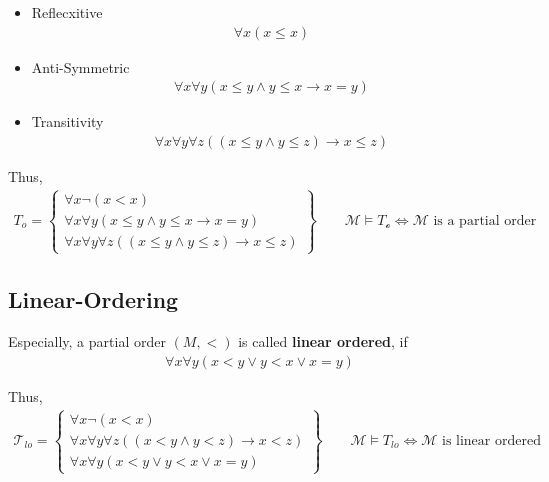 \documentclass[Total.tex]{subfiles}
\begin{document}
\begin{Def}
\begin{itemize}
\begin{itemize}
						\item Reflecxitive
						\begin{gather*}
							\forall x(x\leq x)
						\end{gather*}
						\item Anti-Symmetric
						\begin{gather*}
							\forall x\forall y(x\leq y\wedge y\leq x\rightarrow x=y)
						\end{gather*}
						\item Transitivity
						\begin{gather*}
							\forall x\forall y\forall z((x\leq y\wedge y\leq z)\rightarrow x\leq z)
						\end{gather*}
					\end{itemize} 
					
					Thus,
					\begin{gather*}
						T_{o}=\begin{Bmatrix}
							\forall x \neg(x<x)\\
							\forall x\forall y(x\leq y\wedge y\leq x\rightarrow x=y)\\
							\forall x\forall y\forall z((x\leq y\wedge y\leq z)\rightarrow x\leq z)
						\end{Bmatrix}\qquad \mathcal{M}\models  T_\mathcal{o}\Leftrightarrow \mathcal{M}\mbox{ is a partial order}
					\end{gather*}
					
				\end{itemize}
			\end{Def}
			\subsection{Linear-Ordering}
			
			\begin{Def}
				Especially, a partial order $(M,<)$ is called \textbf{linear ordered}, if
				\begin{gather*}
					\forall x\forall y(x<y\vee y<x\vee x=y)
				\end{gather*}
				
				Thus,
				\begin{gather*}
					\mathcal{T}_{lo}=\begin{Bmatrix}
						\forall x \neg(x<x)\\
						\forall x\forall y\forall z((x<y\wedge y<z)\rightarrow x<z)\\
						\forall x\forall y(x<y\vee y<x\vee x=y)
					\end{Bmatrix}\qquad \mathcal{M}\models T_{lo}\Leftrightarrow \mathcal{M}\mbox{ is linear ordered}
				\end{gather*}


			\end{Def}
\end{document}
